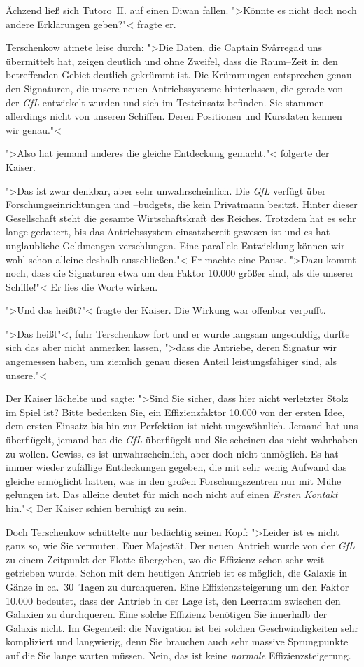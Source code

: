 Ächzend ließ sich Tutoro~II. auf einen Diwan fallen. ">Könnte es nicht doch noch andere Erklärungen geben?"< fragte er.

Terschenkow atmete leise durch: ">Die Daten, die Captain Svårregad uns übermittelt hat, zeigen deutlich und ohne Zweifel, dass die Raum--Zeit in den betreffenden Gebiet deutlich gekrümmt ist. Die Krümmungen entsprechen genau den Signaturen, die unsere neuen Antriebssysteme hinterlassen, die gerade von der \emph{GfL} entwickelt wurden und sich im Testeinsatz befinden. Sie stammen allerdings nicht von unseren Schiffen. Deren Positionen und Kursdaten kennen wir genau."<

">Also hat jemand anderes die gleiche Entdeckung gemacht."< folgerte der Kaiser.

">Das ist zwar denkbar, aber sehr unwahrscheinlich. Die \emph{GfL} verfügt über Forschungseinrichtungen und --budgets, die kein Privatmann besitzt. Hinter dieser Gesellschaft steht die gesamte Wirtschaftskraft des Reiches. Trotzdem hat es sehr lange gedauert, bis das Antriebssystem einsatzbereit gewesen ist und es hat unglaubliche Geldmengen verschlungen. Eine parallele Entwicklung können wir wohl schon alleine deshalb ausschließen."< Er machte eine Pause. ">Dazu kommt noch, dass die Signaturen etwa um den Faktor 10.000 größer sind, als die unserer Schiffe!"< Er lies die Worte wirken.

">Und das heißt?"< fragte der Kaiser. Die Wirkung war offenbar verpufft.

">Das heißt"<, fuhr Terschenkow fort und er wurde langsam ungeduldig, durfte sich das aber nicht anmerken lassen, ">dass die Antriebe, deren Signatur wir angemessen haben, um ziemlich genau diesen Anteil leistungsfähiger sind, als unsere."<

Der Kaiser lächelte und sagte: ">Sind Sie sicher, dass hier nicht verletzter Stolz im Spiel ist? Bitte bedenken Sie, ein Effizienzfaktor 10.000 von der ersten Idee, dem ersten Einsatz bis hin zur Perfektion ist nicht ungewöhnlich. Jemand hat uns überflügelt, jemand hat die \emph{GfL} überflügelt und Sie scheinen das nicht wahrhaben zu wollen. Gewiss, es ist unwahrscheinlich, aber doch nicht unmöglich. Es hat immer wieder zufällige Entdeckungen gegeben, die mit sehr wenig Aufwand das gleiche ermöglicht hatten, was in den großen Forschungszentren nur mit Mühe gelungen ist. Das alleine deutet für mich noch nicht auf einen \emph{Ersten Kontakt} hin."< Der Kaiser schien beruhigt zu sein.

Doch Terschenkow schüttelte nur bedächtig seinen Kopf: ">Leider ist es nicht ganz so, wie Sie vermuten, Euer Majestät. Der neuen Antrieb wurde von der \emph{GfL} zu einem Zeitpunkt der Flotte übergeben, wo die Effizienz schon sehr weit getrieben wurde. Schon mit dem heutigen Antrieb ist es möglich, die Galaxis in Gänze in ca.~30~Tagen zu durchqueren. Eine Effizienzsteigerung um den Faktor 10.000 bedeutet, dass der Antrieb in der Lage ist, den Leerraum zwischen den Galaxien zu durchqueren. Eine solche Effizienz benötigen Sie innerhalb der Galaxis nicht. Im Gegenteil: die Navigation ist bei solchen Geschwindigkeiten sehr kompliziert und langwierig, denn Sie brauchen auch sehr massive Sprungpunkte auf die Sie lange warten müssen. Nein, das ist keine \emph{normale} Effizienzsteigerung.

